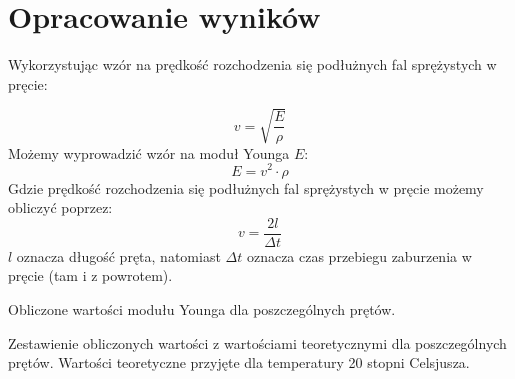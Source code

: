 \documentclass[polish, a4paper]{article}
\begin{document}
\section{Opracowanie wyników}

Wykorzystując wzór na prędkość rozchodzenia się podłużnych fal sprężystych w pręcie:

\begin{equation}
v = \sqrt{\frac{E}{\rho}}
\end{equation}
Możemy wyprowadzić wzór na moduł Younga $E$:
\begin{equation}
E = v^2 \cdot \rho
\end{equation}
Gdzie prędkość rozchodzenia się podłużnych fal sprężystych w pręcie możemy obliczyć poprzez:
\begin{equation}
v = \frac{2l}{\Delta t}
\end{equation}
$l$ oznacza długość pręta, natomiast $\Delta t$ oznacza czas przebiegu zaburzenia w pręcie (tam i z powrotem).

\begin{table}[H]
    \centering
    \caption{Obliczone wartości modułu Younga dla poszczególnych prętów.}
\end{table}


\begin{table}[H]
    \centering
    \caption{Zestawienie obliczonych wartości z wartościami teoretycznymi dla poszczególnych prętów. Wartości teoretyczne przyjęte dla temperatury 20 stopni Celsjusza.}
\end{table}
\end{document}
